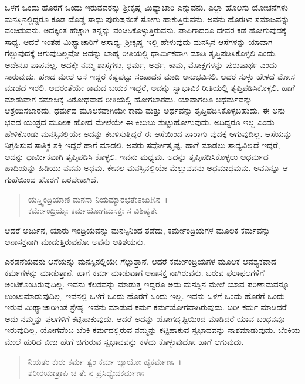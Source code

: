 ಒಳಗೆ ಒಂದು ಹೊರಗೆ ಒಂದು ಇರುವವರನ್ನು ಶ‍್ರೀಕೃಷ್ಣ ಮಿಥ್ಯಾಚಾರಿ ಎನ್ನುವನು. ಎಲ್ಲಾ ಹೊಲಸು ಯೋಚನೆಗಳು ಮನಸ್ಸಿನಲ್ಲಿದ್ದರೂ ಕೂಡ ದೊಡ್ಡ ಸಾಧು ಪುರುಷನಂತೆ ಸೋಗು ಹಾಕುತ್ತಿರುವನು. ಅವನು ಹೊರಗಿನ ಸಮಾಜವನ್ನು ವಂಚಿಸುವನು. ಅದಕ್ಕಿಂತ ಹೆಚ್ಚಾಗಿ ತನ್ನನ್ನು ವಂಚಿಸಿಕೊಳ್ಳುತ್ತಿರುವನು. ಪಾಪಿಗಾದರೂ ದೇವರ ಕಡೆ ಹೋಗುವುದಕ್ಕೆ ಸಾಧ್ಯ. ಆದರೆ ಇಂತಹ ಮಿಥ್ಯಾಚಾರಿಗೆ ಅಸಾಧ್ಯ. ಶ‍್ರೀಕೃಷ್ಣ ಇಲ್ಲಿ ಹೇಳುವುದು ಮನಸ್ಸಿನ ಆಸೆಗಳನ್ನು ಯಾವಾಗ ಗೆಲ್ಲುವುದಕ್ಕೆ ಆಗುವುದಿಲ್ಲವೋ ಅದನ್ನು ಬಾಹ್ಯ ರೀತಿಯಲ್ಲಿ ಧಾರ್ಮಿಕವಾಗಿ ಮಾಡಿ ತೃಪ್ತಿಪಡಿಸಿಕೊಳ್ಳಲಿ ಎಂದು. ಅದೇನೂ ಪಾಪವಲ್ಲ. ಅದಕ್ಕೇ ನಮ್ಮ ಶಾಸ್ತ್ರಗಳು, ಧರ್ಮ, ಅರ್ಥ, ಕಾಮ, ಮೋಕ್ಷಗಳನ್ನು ಪುರುಷಾರ್ಥ ಎಂದು ಸಾರುವುದು. ಹಣದ ಮೇಲೆ ಆಸೆ ಇದ್ದರೆ ಕಷ್ಟಪಟ್ಟು ಸಂಪಾದನೆ ಮಾಡಿ ಅನುಭವಿಸಲಿ. ಆದರೆ ಸುಳ್ಳು ಹೇಳದೆ ಮೋಸ ಮಾಡದೆ ಇರಲಿ. ಅದರಂತೆಯೇ ಕಾಮದ ಬಯಕೆ ಇದ್ದರೆ, ಅದನ್ನು ಸ್ವಾಭಾವಿಕ ರೀತಿಯಲ್ಲಿ ತೃಪ್ತಿಪಡಿಸಿಕೊಳ್ಳಲಿ. ಹಾಗೆ ಮಾಡುವಾಗ ಸಮಾಜಕ್ಕೆ ವಿರೋಧವಾದ ರೀತಿಯಲ್ಲಿ ಹೋಗಬಾರದು. ಯಾವಾಗಲೂ ಅಧರ್ಮವನ್ನು ಆಶ್ರಯಿಸಬಾರದು. ಧರ್ಮದ ಮೂಲಕವಾಗಿಯೇ ಕಾಮ ಮತ್ತು ಅರ್ಥವನ್ನು ತೃಪ್ತಿಪಡಿಸಿಕೊಳ್ಳಬಹುದು. ಈ ಅನು ಭವದ ಯಂತ್ರದ ಮೂಲಕ ಹೋದ ಮೇಲೆಯೇ ಈ ಕಿಲುಬು ಸುಟ್ಟುಹೋಗುವುದು. ಅದಿದ್ದರೂ ಇಲ್ಲ ಎಂದು ಹೇಳಿಕೊಂಡು ಮನಸ್ಸಿನಲ್ಲಿಯೇ ಅದನ್ನು ಕಬಳಿಸುತ್ತಿದ್ದರೆ ಈ ಆಸೆಯಿಂದ ಪಾರಾಗು ವುದಕ್ಕೆ ಆಗುವುದಿಲ್ಲ. ಆಸೆಯನ್ನು ನಿಗ್ರಹಿಸುವ ಸಾತ್ತ್ವಿಕ ಶಕ್ತಿ ಇದ್ದರೆ ಹಾಗೆ ಮಾಡಲಿ. ಅವರು ಸರ್ವೋತ್ಕೃಷ್ಟ. ಹಾಗೆ ಮಾಡಲು ಸಾಧ್ಯವಿಲ್ಲದೆ ಇದ್ದರೆ, ಅದನ್ನು ಧಾರ್ಮಿಕವಾಗಿ ತೃಪ್ತಿಪಡಿಸಿ ಕೊಳ್ಳಲಿ. ಇವನು ಮಧ್ಯಮ. ಅದನ್ನು ತೃಪ್ತಿಪಡಿಸಿಕೊಳ್ಳಲು ಅಧರ್ಮದ ಹಾದಿಯನ್ನು ಹಿಡಿಯು ವವನು ಅಧಮ. ಕೇವಲ ಮನಸ್ಸಿನಲ್ಲಿಯೇ ಮೆಲ್ಲುವವನು ಅಧಮಾಧಮನು. ಅವನಿನ್ನೂ ಆ ಗುಹೆಯಿಂದ ಹೊರಗೆ ಬರಬೇಕಾಗಿದೆ.

\begin{verse}
ಯಸ್ತ್ವಿಂದ್ರಿಯಾಣಿ ಮನಸಾ ನಿಯಮ್ಯಾರಭತೇಽಜುRನ~।\\ಕರ್ಮೇಂದ್ರಿಯೈಃ ಕರ್ಮಯೋಗಮಸಕ್ತಃ ಸ ವಿಶಿಷ್ಯತೇ 
\end{verse}

{\small ಆದರೆ ಅರ್ಜುನ, ಯಾರು ಇಂದ್ರಿಯವನ್ನು ಮನಸ್ಸಿನಿಂದ ತಡೆದು, ಕರ್ಮೇಂದ್ರಿಯಗಳ ಮೂಲಕ ಕರ್ಮವನ್ನು ಅನಾಸಕ್ತನಾಗಿ ಮಾಡುತ್ತಿರುವನೋ ಅವನು ಅತಿಶಯನು.}

ಎರಡನೆಯವನು ಆಸೆಯನ್ನು ಮನಸ್ಸಿನಲ್ಲಿಯೇ ಗೆಲ್ಲುತ್ತಾನೆ. ಆದರೆ ಕರ್ಮೇಂದ್ರಿಯಗಳ ಮೂಲಕ ಆವಶ್ಯಕವಾದ ಕರ್ಮಗಳನ್ನು ಮಾಡುತ್ತಾನೆ. ಹಾಗೆ ಕರ್ಮ ಮಾಡುವಾಗ ಅನಾಸಕ್ತ ನಾಗಿರುವನು. ಬರುವ ಫಲಾಫಲಗಳಿಗೆ ಅಂಟಿಕೊಂಡಿರುವುದಿಲ್ಲ. ಇವನು ಕೆಲಸವನ್ನು ಮಾಡುತ್ತ ಇದ್ದರೂ ಅದು ಮನಸ್ಸಿನ ಮೇಲೆ ಯಾವ ಪರಿಣಾಮವನ್ನೂ ಉಂಟುಮಾಡುವುದಿಲ್ಲ. ಇವನಲ್ಲಿ ಒಳಗೆ ಒಂದು ಹೊರಗೆ ಒಂದು ಇಲ್ಲ. ಇವನು ಒಳಗೆ ಒಂದು ಹೊರಗೆ ಒಂದು ಇರುವ ಮಿಥ್ಯಾಚಾರಿಗಿಂತ ಶ್ರೇಷ್ಠ. ಇವನು ಮಾಡುವ ಕರ್ಮ ಕರ್ಮಯೋಗವಾಗಿರುವುದು. ಬರೀ ಕರ್ಮ ಮಾಡಿದರೆ ಅದು ನಮ್ಮನ್ನು ಫಲಗಳಿಗೆ ಕಟ್ಟಿಹಾಕುವುದು. ಆದರೆ ಅದನ್ನು ಯೋಗದೃಷ್ಟಿಯಿಂದ ಮಾಡಿದರೆ ಯಾವ ಬಂಧನವೂ ಇರುವುದಿಲ್ಲ. ಯೋಗವೆಂಬ ಬೆಂಕಿ ಕರ್ಮದಲ್ಲಿರುವ ನಮ್ಮನ್ನು ಕಟ್ಟಿಹಾಕುವ ಸ್ವಭಾವವನ್ನು ನಾಶಮಾಡುವುದು. ಬೆಂಕಿಯ ಮೇಲೆ ಹುರಿದ ಬೀಜ ಹೇಗೆ ಚಿಗುರುವ ಸ್ವಭಾವವನ್ನು ಕಳೆದು ಕೊಳ್ಳುವುದೋ ಹಾಗೆ ಆಗುವುದು.

\begin{verse}
ನಿಯತಂ ಕುರು ಕರ್ಮ ತ್ವಂ ಕರ್ಮ ಜ್ಯಾಯೋ ಹ್ಯಕರ್ಮಣಃ~।\\ಶರೀರಯಾತ್ರಾಪಿ ಚ ತೇ ನ ಪ್ರಸಿಧ್ಯೇದಕರ್ಮಣಃ 
\end{verse}

